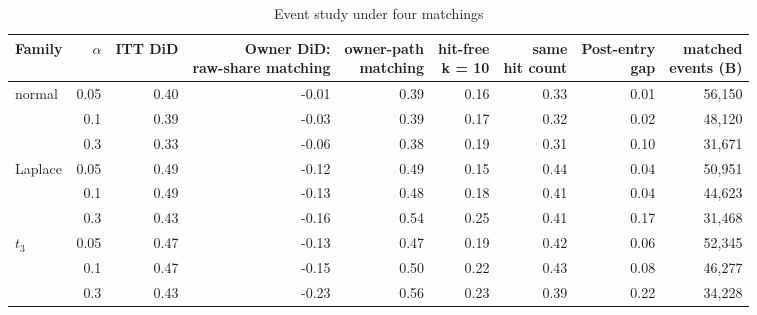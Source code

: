 \begin{table}
\centering
\caption{Event study under four matchings}
\label{tab:a14_event_study}
\small
\begin{tabular}{lrrrrrrrr}
\toprule
Family & $\alpha$ & ITT DiD & \makecell[b]{Owner DiD:\\{}raw-share matching} & \makecell[b]{owner-path\\{}matching} & \makecell[b]{hit-free\\{}k = 10} & \makecell[b]{same\\{}hit count} & \makecell[b]{Post-entry\\{}gap} & \makecell[b]{matched\\{}events (B)} \\
\midrule
normal & 0.05 & 0.40 & -0.01 & 0.39 & 0.16 & 0.33 & 0.01 & 56,150 \\
 & 0.1 & 0.39 & -0.03 & 0.39 & 0.17 & 0.32 & 0.02 & 48,120 \\
 & 0.3 & 0.33 & -0.06 & 0.38 & 0.19 & 0.31 & 0.10 & 31,671 \\
Laplace & 0.05 & 0.49 & -0.12 & 0.49 & 0.15 & 0.44 & 0.04 & 50,951 \\
 & 0.1 & 0.49 & -0.13 & 0.48 & 0.18 & 0.41 & 0.04 & 44,623 \\
 & 0.3 & 0.43 & -0.16 & 0.54 & 0.25 & 0.41 & 0.17 & 31,468 \\
$t_3$ & 0.05 & 0.47 & -0.13 & 0.47 & 0.19 & 0.42 & 0.06 & 52,345 \\
 & 0.1 & 0.47 & -0.15 & 0.50 & 0.22 & 0.43 & 0.08 & 46,277 \\
 & 0.3 & 0.43 & -0.23 & 0.56 & 0.23 & 0.39 & 0.22 & 34,228 \\
\bottomrule
\end{tabular}
\end{table}
